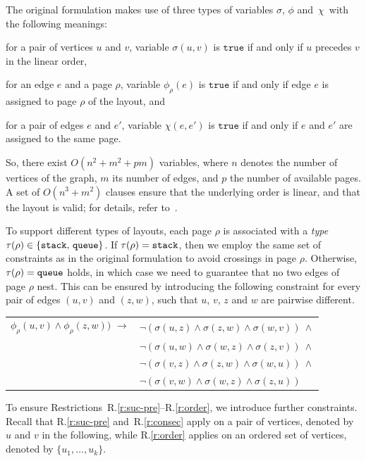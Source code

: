 \documentclass[runningheads]{llncs}
\newcommand{\tabularbefore}{\vspace{4pt}\noindent}
\newcommand{\tabularafter}{\vspace{4pt}}
\begin{document}
The original formulation makes use of three types of variables $\sigma$, $\phi$ and~$\chi$~with the following meanings: 
\begin{inparaenum}[(i)]
\item for a pair of vertices $u$ and $v$, variable $\sigma(u,v)$ is $\texttt{true}$ if and only if $u$ precedes $v$ in the linear order, 
\item for an edge $e$ and a page $\rho$, variable $\phi_\rho(e)$ is $\texttt{true}$ if and only if edge $e$ is assigned to page $\rho$ of the layout, and 
\item for a pair of edges $e$ and $e'$, variable $\chi(e,e')$ is $\texttt{true}$ if and only if $e$ and $e'$ are assigned to the same page.
\end{inparaenum}  
So, there exist $O(n^2+m^2+pm)$ variables, where $n$ denotes the number of vertices of the graph, $m$ its number of edges, and $p$ the number of available pages. A set of $O(n^3+m^2)$ clauses ensure that the underlying order is linear, and that the layout is valid; for  details, refer to~\cite{DBLP:conf/gd/Bekos0Z15}.

To support different types of layouts, each page $\rho$ is associated with a \emph{type} $\tau(\rho)\in\{\text{\texttt{stack}, \texttt{queue}}\}$. If $\tau(\rho)=\text{\texttt{stack}}$, then we employ the same set of constraints as in the original formulation to avoid crossings in page $\rho$. Otherwise, $\tau(\rho)=\text{\texttt{queue}}$ holds, in which case we need to guarantee that no two edges of page $\rho$ nest. This can be ensured by introducing the following constraint for every pair of edges $(u,v)$ and $(z, w)$, such that $u$, $v$, $z$ and $w$ are pairwise different.

\tabularbefore
\begin{tabular}{ll}
$\phi_\rho(u,v) \wedge \phi_\rho(z,w))$ $\rightarrow$ &  
  $\neg (\sigma(u,z) \wedge \sigma(z,w) \wedge \sigma(w,v))~\wedge$\\
& $\neg (\sigma(u,w) \wedge \sigma(w,z) \wedge \sigma(z,v))~\wedge$\\
& $\neg (\sigma(v,z) \wedge \sigma(z,w) \wedge \sigma(w,u))~\wedge$\\ 
& $\neg (\sigma(v,w) \wedge \sigma(w,z) \wedge \sigma(z,u))$\\
\end{tabular}
\tabularafter

\noindent To ensure Restrictions~R.\ref{r:suc-pre}--R.\ref{r:order}, we introduce further constraints. Recall that R.\ref{r:suc-pre} and~R.\ref{r:consec} apply on a pair of vertices, denoted by $u$ and $v$ in the following, while R.\ref{r:order} applies on an ordered set of vertices, denoted by $\{u_1,\ldots,u_k\}$.
\end{document}
